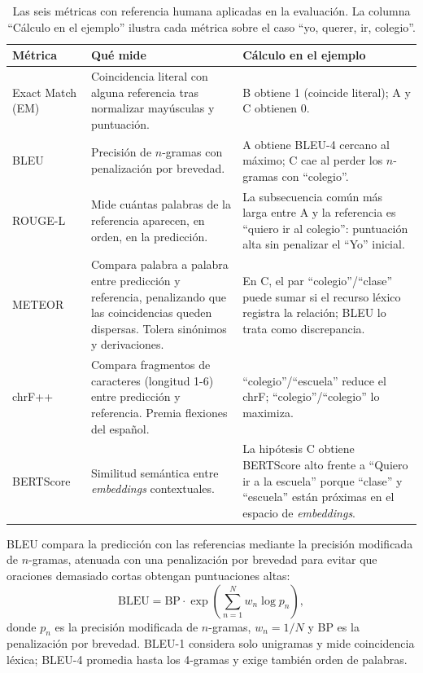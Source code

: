 \begin{table}[H]
\centering
\small
\begin{tabular}{l p{5cm} p{6cm}}
\hline
Métrica & Qué mide & Cálculo en el ejemplo \\
\hline
Exact Match (EM) & Coincidencia literal con alguna referencia tras normalizar mayúsculas y puntuación. & B obtiene 1 (coincide literal); A y C obtienen 0. \\
BLEU~\cite{papineni2002bleu} & Precisión de $n$-gramas con penalización por brevedad. & A obtiene BLEU-4 cercano al máximo; C cae al perder los $n$-gramas con ``colegio''. \\
ROUGE-L~\cite{lin2004rouge} & Mide cuántas palabras de la referencia aparecen, en orden, en la predicción. & La subsecuencia común más larga entre A y la referencia es ``quiero ir al colegio'': puntuación alta sin penalizar el ``Yo'' inicial. \\
METEOR~\cite{banerjee2005meteor} & Compara palabra a palabra entre predicción y referencia, penalizando que las coincidencias queden dispersas. Tolera sinónimos y derivaciones. & En C, el par ``colegio''/``clase'' puede sumar si el recurso léxico registra la relación; BLEU lo trata como discrepancia. \\
chrF++~\cite{popovic2017chrf} & Compara fragmentos de caracteres (longitud 1-6) entre predicción y referencia. Premia flexiones del español. & ``colegio''/``escuela'' reduce el chrF; ``colegio''/``colegio'' lo maximiza. \\
BERTScore~\cite{zhang2020bertscore} & Similitud semántica entre \textit{embeddings} contextuales. & La hipótesis C obtiene BERTScore alto frente a ``Quiero ir a la escuela'' porque ``clase'' y ``escuela'' están próximas en el espacio de \textit{embeddings}. \\
\hline
\end{tabular}
\caption{Las seis métricas con referencia humana aplicadas en la evaluación. La columna ``Cálculo en el ejemplo'' ilustra cada métrica sobre el caso ``yo, querer, ir, colegio''.}
\label{tab:eval-metricas-referencia}
\end{table}

BLEU compara la predicción con las referencias mediante la precisión modificada de $n$-gramas, atenuada con una penalización por brevedad para evitar que oraciones demasiado cortas obtengan puntuaciones altas:
\begin{equation}
\text{BLEU} = \text{BP} \cdot \exp\!\left(\sum_{n=1}^{N} w_n \log p_n\right),
\end{equation}
donde $p_n$ es la precisión modificada de $n$-gramas, $w_n = 1/N$ y BP es la penalización por brevedad. BLEU-1 considera solo unigramas y mide coincidencia léxica; BLEU-4 promedia hasta los 4-gramas y exige también orden de palabras.

